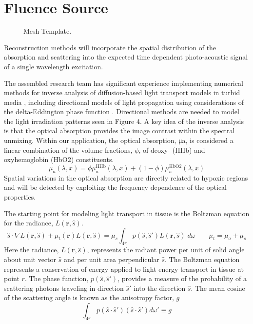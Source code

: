 \documentclass{article}         %
\theoremstyle{definition}
\theoremstyle{remark}
\newcommand{\picdir}{Figures}
\begin{document}
\section{Fluence Source}\label{FluenceSource}

\begin{figure}[h]
\centering
{}
\caption{ Mesh Template.
} \label{DistributionComparison}
\end{figure}
{ \color{blue}
Reconstruction methods will incorporate the spatial distribution of the
absorption and scattering into the expected time dependent photo-acoustic
signal of a single wavelength excitation. 

The assembled research team has significant experience implementing
numerical methods for inverse analysis of diffusion-based light transport
models in turbid media
\cite{maclellan2013estimating,fuentesetal12a,fuentesetal09,Fuentesetal08}, 
including directional models of light
propagation using considerations of the delta-Eddington phase function 
\cite{maclellan2013estimating,fuentesetal12a}. 
Directional methods are needed to model the light irradiation patterns
seen in Figure 4. A key idea of the inverse analysis is that the optical
absorption provides the image contrast within the spectral unmixing. 
Within our application, the optical absorption, μa, is considered a linear
combination of the volume fractions, $\phi$, of deoxy- (HHb) and oxyhemoglobin
(HbO2) constituents.
\[
\mu_a (\lambda,x) = \phi \mu_a^\text{HHb} (\lambda,x) + (1-\phi)\mu_a^\text{HbO2} (\lambda,x)
\]
Spatial variations in the optical absorption are directly related to hypoxic
regions and will be detected by exploiting the frequency dependence of the
optical properties. 
}



The starting point for modeling light transport in tissue is the Boltzman
equation for the radiance, $L(\mathbf{r},\hat{s})$.
\begin{equation}\label{TransportEquation}
\hat{s} \cdot \nabla L(\mathbf{r},\hat{s})
+ \mu_t (\mathbf{r})  L(\mathbf{r},\hat{s})
 = 
\mu_s \int_{4\pi} p(\hat{s},\hat{s}') L(\mathbf{r},\hat{s}) \; d \omega
\qquad
\mu_t = \mu_a + \mu_s
\end{equation}
Here the radiance,  $L(\mathbf{r},\hat{s}) $, represents the radiant power per unit
of solid angle about unit vector $\hat{s}$ and per unit area perpendicular
$\hat{s}$.
The Boltzman equation represents a conservation of energy applied to light
energy transport in tissue at point $r$.
The phase function, $p(\hat{s},\hat{s}')$, provides a measure of the
probability of a scattering photons traveling in direction $\hat{s}'$ 
into the direction $\hat{s}$. The mean cosine  of the scattering angle
is known as the anisotropy factor, $g$
\[
 \int_{4\pi} p(\hat{s} \cdot \hat{s}')(\hat{s} \cdot \hat{s}') d\omega' \equiv g
\]
\end{document}
